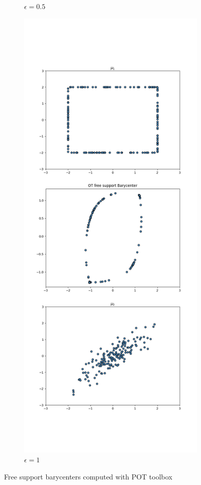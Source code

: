 \documentclass[a4paper, 11pt]{article}
\begin{document}
\begin{figure}
\begin{subfigure}{0.5\textwidth}
        \caption{$\epsilon=0.5$}
    \end{subfigure}
    \begin{subfigure}{.5\textwidth}
        \centering
        \includegraphics[width=\textwidth]{figures/ot_barycenter_reg1.png}
        \caption{$\epsilon=1$}
    \end{subfigure}
    \caption{Free support barycenters computed with POT toolbox}
    \label{pot3}
\end{figure}
\end{document}
